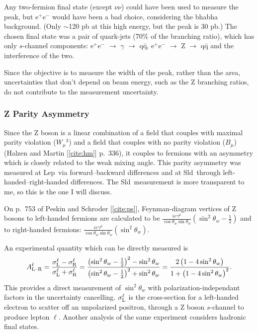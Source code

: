 \documentclass[12pt]{article}
\def\lep{{\sc Lep}}
\def\sld{{\sc Sld}}
\begin{document}
Any two-fermion final state (except $\nu \nu$) could have been used to
measure the peak, but e$^+$e$^-$ would have been a bad choice,
considering the bhabha background. (Only $\sim$120 pb at this high
energy, but the peak is 30 pb.) The chosen final state was a pair of
quark-jets (70\% of the branching ratio), which has only $s$-channel
components: e$^+$e$^-$ $\to$ $\gamma$ $\to$ q\={q}, e$^+$e$^-$
$\to$ Z $\to$ q\={q} and the interference of the two.

Since the objective is to measure the width of the peak, rather than
the area, uncertainties that don't depend on beam energy, such as the
Z branching ratios, do not contribute to the measurement uncertainty.

\subsubsection{Z Parity Asymmetry}

Since the Z boson is a linear combination of a field that couples with
maximal parity violation ($W_\mu$$^3$) and a field that couples with
no parity violation ($B_\mu$) (Halzen and Martin [\ref{cite:hm}]
p.~336), it couples to fermions with an asymmetry which is closely
related to the weak mixing angle. This parity asymmetry was measured
at \lep\ via forward--backward differences and at \sld\ through
left-handed--right-handed differences. The \sld\ measurement is more
transparent to me, so this is the one I will discuss.

On p.~753 of Peskin and Schroder [\ref{cite:ps}], Feynman-diagram
vertices of Z bosons to left-handed fermions are calculated to be
$\displaystyle \frac{ie\gamma^\mu}{\cos\theta_w \sin\theta_w}
\left(\sin^2\theta_w - \frac{1}{2}\right)$ and to right-handed
fermions: $\displaystyle \frac{ie\gamma^\mu}{\cos\theta_w
\sin\theta_w} \left(\sin^2\theta_w\right)$. 

An experimental quantity which can be directly measured is
\begin{equation}
  A^\ell_{\mbox{\scriptsize L--R}} = \frac{\sigma^\ell_{\mbox{\scriptsize L}} -
    \sigma^\ell_{\mbox{\scriptsize R}}}{\sigma^\ell_{\mbox{\scriptsize L}} + \sigma^\ell_{\mbox{\scriptsize R}}}
  = \frac{\left(\sin^2\theta_w - \frac{1}{2}\right)^2 -
    \sin^2\theta_w}{\left(\sin^2\theta_w - \frac{1}{2}\right)^2 +
    \sin^2\theta_w}
  = \frac{2\left(1 - 4\sin^2\theta_w\right)}{1 + \left(1 -
    4\sin^2\theta_w\right)^2}\mbox{.}
\end{equation}
This provides a direct measurement of $\sin^2\theta_w$ with
polarization-independant factors in the uncertainty cancelling.
$\sigma^\ell_{\mbox{\scriptsize L}}$ is the cross-section for a left-handed
electron to scatter off an unpolarized positron, through a Z boson
$s$-channel to produce lepton $\ell$. Another analysis of the same
experiment considers hadronic final states.
\end{document}

